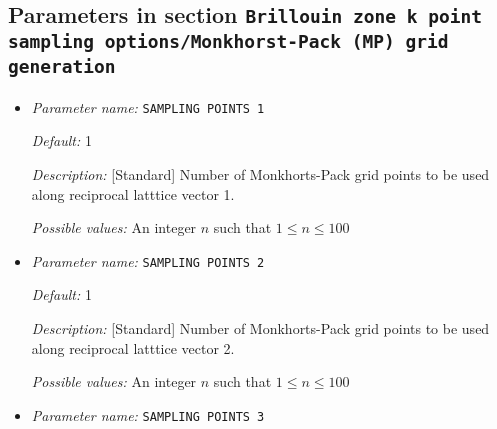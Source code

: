 \subsection{Parameters in section \tt Brillouin zone k point sampling options/Monkhorst-Pack (MP) grid generation}
\label{parameters:Brillouin_20zone_20k_20point_20sampling_20options/Monkhorst_2dPack_20_28MP_29_20grid_20generation}

\begin{itemize}
\item {\it Parameter name:} {\tt SAMPLING POINTS 1}
\label{parameters:Brillouin zone k point sampling options/Monkhorst_2dPack _28MP_29 grid generation/SAMPLING POINTS 1}
\label{parameters:Brillouin_20zone_20k_20point_20sampling_20options/Monkhorst_2dPack_20_28MP_29_20grid_20generation/SAMPLING_20POINTS_201}




{\it Default:} 1


{\it Description:} [Standard] Number of Monkhorts-Pack grid points to be used along reciprocal latttice vector 1.


{\it Possible values:} An integer $n$ such that $1\leq n \leq 100$
\item {\it Parameter name:} {\tt SAMPLING POINTS 2}
\label{parameters:Brillouin zone k point sampling options/Monkhorst_2dPack _28MP_29 grid generation/SAMPLING POINTS 2}
\label{parameters:Brillouin_20zone_20k_20point_20sampling_20options/Monkhorst_2dPack_20_28MP_29_20grid_20generation/SAMPLING_20POINTS_202}




{\it Default:} 1


{\it Description:} [Standard] Number of Monkhorts-Pack grid points to be used along reciprocal latttice vector 2.


{\it Possible values:} An integer $n$ such that $1\leq n \leq 100$
\item {\it Parameter name:} {\tt SAMPLING POINTS 3}
\label{parameters:Brillouin zone k point sampling options/Monkhorst_2dPack _28MP_29 grid generation/SAMPLING POINTS 3}
\label{parameters:Brillouin_20zone_20k_20point_20sampling_20options/Monkhorst_2dPack_20_28MP_29_20grid_20generation/SAMPLING_20POINTS_203}



\end{itemize}

